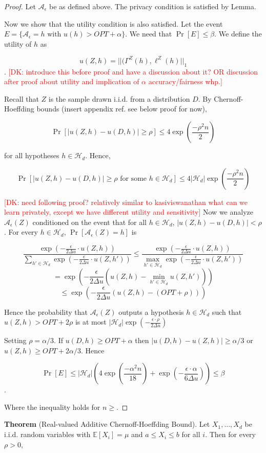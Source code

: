 \documentclass[format = sigconf]{acmart}
\newcommand{\dk}[1]{\textcolor{red}{[DK: #1]}}
\newcommand{\A}{\mathcal{A}}
\renewcommand{\H}{\mathcal{H}}
\newcommand{\1}{\mathbbm{1}}
\newcommand{\eps}{\epsilon}
\theoremstyle{definition}
\begin{document}
\begin{proof}
	Let $\A_{\eps}$ be as defined above. The privacy condition is
  satisfied by Lemma.

	Now we show that the utility condition is also satisfied. Let the
  event $E = \{\A_{\eps} = h \text{ with } u(h) > OPT + \alpha\}$. We
  need that $\Pr[E] \leq \beta$. We define the utility of $h$ as

	$$u(Z,h) = ||(\Gamma^Z(h), \ell^Z(h)||_{1}$$.
\dk {introduce this before proof and have a discussion about it? OR discussion after proof about utility and implication of $\alpha$ accuracy/fairness whp.}

	Recall that $Z$ is the sample drawn i.i.d. from a distribution $D$.
  By Chernoff-Hoeffding bounds (insert appendix ref. see below proof
  for now),

	$$\Pr[|u(Z,h) - u(D,h)| \geq \rho] \leq 4\exp(\frac{-\rho^2n}{2})$$

	for all hypotheses $h \in \H_d$. Hence,

	$$\Pr[|u(Z,h) - u(D,h)| \geq \rho \text{ for some } h \in \H_d] \leq 4|\H_d|\exp(\frac{-\rho^2n}{2})$$

	\dk{need following proof? relatively similar to kasiviswanathan what
  can we learn privately, except we have different utility and sensitivity}
	Now we analyze $\A_\eps(Z)$ conditioned on the event that for all
  $h\in \H_d$, $|u(Z,h) - u(D,h)| < \rho$. For every $h \in \H_d$, $\Pr[\A_\eps(Z) = h]$ is

	$$\frac{\exp(-\frac{\eps}{2\Delta u} \cdot
  u(Z,h))}{\sum_{h'\in\H_d}\exp(-\frac{\eps}{2\Delta u} \cdot u(Z,h'))}
  \leq \frac{\exp(-\frac{\eps}{2\Delta u} \cdot
  u(Z,h))}{\max_{h'\in\H_d}\exp(-\frac{\eps}{2\Delta u} \cdot u(Z,h'))} $$
	$$= \exp(-\frac{\eps}{2\Delta u}(u(Z,h) - \min_{h'\in\H_d}u(Z,h')))$$
	$$\leq \exp(-\frac{\eps}{2\Delta u}(u(Z,h) - (OPT + \rho)))$$

	Hence the probability that $\A_\eps(Z)$ outputs a hypothesis $h \in
  \H_d$ such that $u(Z,h) > OPT + 2\rho$ is at most
  $|\H_d|\exp(-\frac{\eps\cdot\rho}{2\Delta u})$

	Setting $\rho = \alpha/3$. If $u(D,h) \geq OPT + \alpha$ then
  $|u(D,h) - u(Z,h)| \geq \alpha/3$ or $u(Z,h) \geq OPT + 2\alpha/3$.
  Hence

	$$\Pr[E] \leq |\H_d|(4\exp(\frac{-\alpha^2n}{18}) + \exp(-\frac{\eps\cdot\alpha}{6\Delta u})) \leq \beta$$.

	Where the inequality holds for $n \geq $.
\end{proof}
{\bf Theorem} (Real-valued Additive Chernoff-Hoeffding Bound). Let
$X_1,...,X_d$ be i.i.d. random variables with $\mathbb{E}[X_i] = \mu$
and $a \leq X_i \leq b$ for all $i$. Then for every $\rho > 0$,
\end{document}
